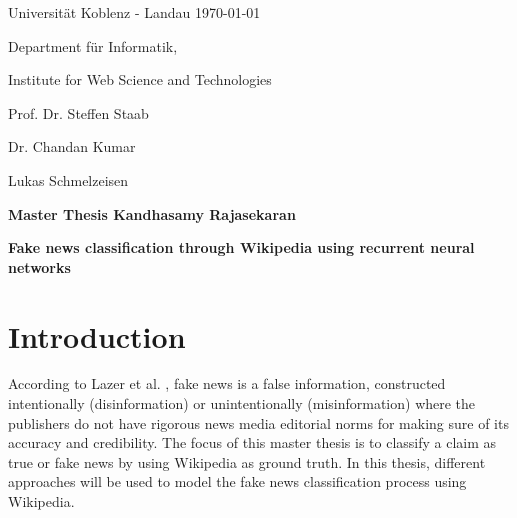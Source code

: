 \documentclass[a4paper, 11pt]{article}
\newcommand{\myName}{Kandhasamy Rajasekaran}
\newcommand{\Title}{Fake news classification through Wikipedia using recurrent neural networks}
\newcommand{\subject}{Institute for Web Science and Technologies}
\newcommand{\expert}{Prof. Dr. Steffen Staab}%
\newcommand{\supervisor}{Dr. Chandan Kumar} %
\newcommand{\secondSupervisor}{Lukas Schmelzeisen} %
\newcommand{\type}{Master Thesis}
\begin{document}
Universit\"{a}t Koblenz - Landau \hfill \today

Department f\"{u}r Informatik,

\subject{}

\expert{}

\supervisor{}

\secondSupervisor{}

\begin{center}
	\large{\bf \type{}  \myName{}}

	\vspace*{0.5cm}

	\large{\bf \Title}
\end{center}

\setlength{\parskip}{1.5ex plus0.5ex minus 0.5ex}
\section{Introduction}
\frenchspacing

According to Lazer et al. \parencite{Lazer1094}, fake news is a false information, constructed intentionally (disinformation) or unintentionally (misinformation) where the publishers do not have rigorous news media editorial norms for making sure of its accuracy and credibility. The focus of this master thesis is to classify a claim as true or fake news by using Wikipedia as ground truth. In this thesis, different approaches will be used to model the fake news classification process using Wikipedia.
\end{document}
